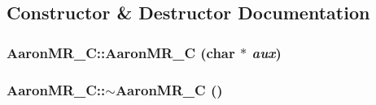 \subsection{Constructor \& Destructor Documentation}
\hypertarget{classAaronMR__C_ad1ea14bf0324c7c0e949d6bbdb470c9f}{
\subsubsection[{AaronMR\_\-C}]{\setlength{\rightskip}{0pt plus 5cm}AaronMR\_\-C::AaronMR\_\-C (char $\ast$ {\em aux})}}
\label{classAaronMR__C_ad1ea14bf0324c7c0e949d6bbdb470c9f}
\hypertarget{classAaronMR__C_abd6b034820bde02aefa4fdfadd9f69cf}{
\subsubsection[{$\sim$AaronMR\_\-C}]{\setlength{\rightskip}{0pt plus 5cm}AaronMR\_\-C::$\sim$AaronMR\_\-C ()}}
\label{classAaronMR__C_abd6b034820bde02aefa4fdfadd9f69cf}


